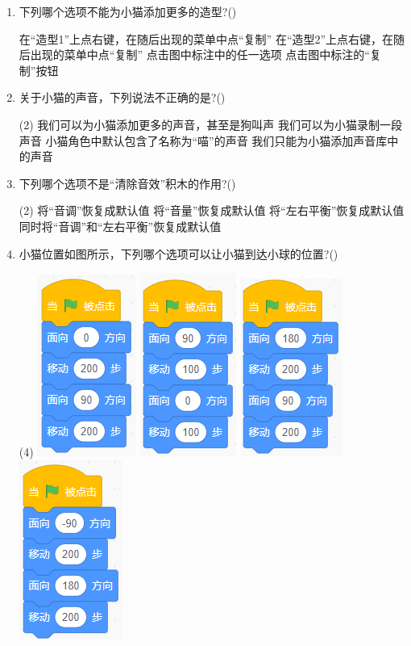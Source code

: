 \documentclass[10pt, a4paper]{article}
\begin{document}
\begin{enumerate}
        \item 下列哪个选项不能为小猫添加更多的造型?(\qquad)
        \begin{tasks}
            \task 在“造型1”上点右键，在随后出现的菜单中点“复制”
            \task 在“造型2”上点右键，在随后出现的菜单中点“复制”
            \task 点击图中标注中的任一选项
            \task 点击图中标注的“复制”按钮
        \end{tasks}

        \item 关于小猫的声音，下列说法不正确的是?(\qquad)
        \begin{tasks}(2)
            \task 我们可以为小猫添加更多的声音，甚至是狗叫声
            \task 我们可以为小猫录制一段声音
            \task 小猫角色中默认包含了名称为“喵”的声音
            \task 我们只能为小猫添加声音库中的声音
        \end{tasks}

        \item 下列哪个选项不是“清除音效”积木的作用?(\qquad)
        \begin{tasks}(2)
            \task 将“音调”恢复成默认值
            \task 将“音量”恢复成默认值
            \task 将“左右平衡”恢复成默认值
            \task 同时将“音调”和“左右平衡”恢复成默认值
        \end{tasks}

        \newpage
        \item 小猫位置如图所示，下列哪个选项可以让小猫到达小球的位置?(\qquad)
        \begin{tasks}(4)
            \task \includegraphics[width=.11\textwidth]{21a.png}
            \task \includegraphics[width=.11\textwidth]{21b.png}
            \task \includegraphics[width=.12\textwidth]{21c.png}
            \task \includegraphics[width=.12\textwidth]{21d.png}
        \end{tasks}


\end{enumerate}
\end{document}
